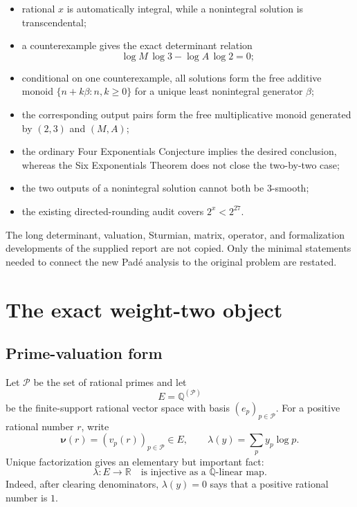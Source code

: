 \documentclass[11pt]{article}
\theoremstyle{definition}
\newcommand{\Q}{\mathbb Q}
\newcommand{\R}{\mathbb R}
\newcommand{\val}{\boldsymbol\nu}
\begin{document}
\begin{itemize}
\item rational $x$ is automatically integral, while a nonintegral solution is transcendental;
\item a counterexample gives the exact determinant relation
\begin{equation}\label{eq:wall}
   \log M\,\log 3-\log A\,\log 2=0;
\end{equation}
\item conditional on one counterexample, all solutions form the free additive monoid
      $\{n+k\beta:n,k\ge0\}$ for a unique least nonintegral generator $\beta$;
\item the corresponding output pairs form the free multiplicative monoid generated by
      $(2,3)$ and $(M,A)$;
\item the ordinary Four Exponentials Conjecture implies the desired conclusion, whereas the
      Six Exponentials Theorem does not close the two-by-two case;
\item the two outputs of a nonintegral solution cannot both be $3$-smooth;
\item the existing directed-rounding audit covers $2^x<2^{27}$.
\end{itemize}

The long determinant, valuation, Sturmian, matrix, operator, and formalization developments of
the supplied report are not copied.  Only the minimal statements needed to connect the new
Pad\'e analysis to the original problem are restated.

\section{The exact weight-two object}

\subsection{Prime-valuation form}

Let $\mathcal P$ be the set of rational primes and let
\[
  E=\Q^{(\mathcal P)}
\]
be the finite-support rational vector space with basis $(e_p)_{p\in\mathcal P}$.  For a
positive rational number $r$, write
\[
  \val(r)=(v_p(r))_{p\in\mathcal P}\in E,
  \qquad
  \lambda(y)=\sum_p y_p\log p.
\]
Unique factorization gives an elementary but important fact:
\begin{equation}\label{eq:lambda-inj}
  \lambda:E\longrightarrow\R\quad\text{is injective as a $\Q$-linear map.}
\end{equation}
Indeed, after clearing denominators, $\lambda(y)=0$ says that a positive rational number is
$1$.
\end{document}
